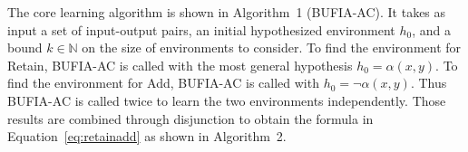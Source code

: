 The core learning algorithm is shown in Algorithm~1 (BUFIA-AC). It takes
as input a set of input-output pairs, an initial hypothesized
environment \(h_0\), and a bound \(k\in\mathbb{N}\) on the size of
environments to consider.
To find the environment for \textsf{Retain}, BUFIA-AC is called with the
most general hypothesis \(h_0=\alpha(x,y)\). To find the environment for
\textsf{Add}, BUFIA-AC is called with  \(h_0=\neg\alpha(x,y)\). Thus
BUFIA-AC is called twice to learn the two environments independently.
Those results are combined through disjunction to obtain the formula in
Equation~\ref{eq:retainadd} as shown in Algorithm~2.


